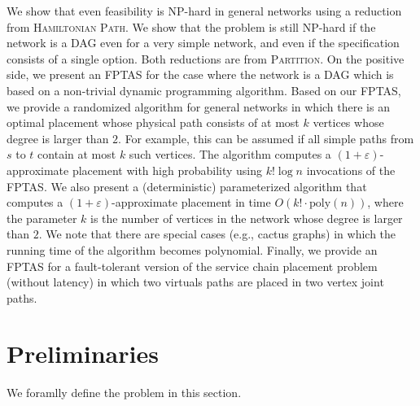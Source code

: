 \documentclass[11pt]{article}
\newcommand{\eps}{\varepsilon}
\begin{document}
We show that even feasibility is NP-hard in general networks using a
reduction from \textsc{Hamiltonian Path}.
We show that the problem is still NP-hard if the network is a DAG even
for a very simple network, and even if the specification consists of a
single option.  Both reductions are from \textsc{Partition}.
%
On the positive side, we present an FPTAS for the case where the
network is a DAG which is based on a non-trivial dynamic programming
algorithm.
%
Based on our FPTAS, we provide a randomized algorithm for general
networks in which there is an optimal placement whose physical path
consists of at most $k$ vertices whose degree is larger than $2$.  For
example, this can be assumed if all simple paths from $s$ to $t$
contain at most $k$ such vertices.  The algorithm computes a
$(1+\eps)$-approximate placement with high probability using $k! \log
n$ invocations of the FPTAS.
%
We also present a (deterministic) parameterized algorithm that
computes a $(1+\eps)$-approximate placement in time $O(k! \cdot
\text{poly}(n))$, where the parameter $k$ is the number of vertices in
the network whose degree is larger than $2$.
%
We note that there are special cases (e.g., cactus graphs) in which
the running time of the algorithm becomes polynomial.
%
Finally, we provide an FPTAS for a fault-tolerant version of the
service chain placement problem (without latency) in which two
virtuals paths are placed in two vertex joint paths.


\section{Preliminaries}

We foramlly define the problem in this section.

\end{document}
